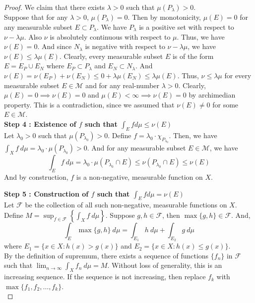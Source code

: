 \begin{proof}
	We claim that there exists $\lambda > 0$ such that $\mu(P_\lambda) > 0$.\\
	Suppose that for any $\lambda > 0$, $\mu(P_\lambda) = 0$.
	Then by monotonicity, $\mu(E) = 0$ for any measurable subset $E \subset P_\lambda$.
	We have $P_\lambda$ is a positive set with respect to $\nu-\lambda\mu$. 
	Also $\nu$ is absolutely continuous with respect to $\mu$.
	Thus, we have $\nu(E)=0$.
	And since $N_\lambda$ is negative with respect to $\nu-\lambda\mu$, we have $\nu(E) \le \lambda\mu(E)$.
	Clearly, every measurable subset $E$ is of the form $E = E_P \cup E_N$ where $E_P \subset P_\lambda$ and $E_N \subset N_\lambda$.
	And $\nu(E)=\nu(E_P) + \nu(E_N) \le 0+\lambda\mu(E_N) \le \lambda\mu(E)$.
	Thus, $\nu \le \lambda\mu$ for every measurable subset $E \in \mathcal{M}$ and for any real-number $\lambda > 0$.
	Clearly, $\mu(E) = 0 \implies \nu(E) = 0$ and $\mu(E) < \infty \implies \nu(E) = 0$ by archimedian property.
	This is a contradiction, since we assumed that $\nu(E) \ne 0$ for some $E \in \mathcal{M}$.\\

	\textbf{Step 4 : Existence of $f$ such that $\int_E fd\mu \le \nu(E)$}\\
	Let $\lambda_0 >0$ such that $\mu(P_{\lambda_0}) > 0$.
	Define $f = \lambda_0 \cdot \chi_{P_{\lambda_0}}$.
	Then, we have $\displaystyle \int_X f \ d\mu = \lambda_0 \cdot \mu(P_{\lambda_0}) > 0$.
	And for any measurable subset $E \in \mathcal{M}$, we have
	\[ \int_E f \ d\mu = \lambda_0 \cdot \mu(P_{\lambda_0} \cap E) \le \nu(P_{\lambda_0} \cap E) \le \nu(E) \]
	And by construction, $f$ is a non-negative, measurable function on $X$.

	\textbf{Step 5 : Construction of $f$ such that $\int_E fd\mu = \nu(E)$}\\
	Let $\mathcal{F}$ be the collection of all such non-negative, measurable functions on $X$.
	Define $\displaystyle M = \sup_{f \in \mathcal{F}} \left\{ \int_X f \ d\mu \right\}$.
	Suppose $g,h \in \mathcal{F}$, then $\max\{g,h\} \in \mathcal{F}$.
	And,
	\[ \int_E \max \{g,h\} \ d\mu = \int_{E_1} h \ d\mu + \int_{E_2} g \ d\mu \]
	where $E_1 = \{ x \in X : h(x) > g(x) \}$ and $E_2 = \{ x \in X : h(x) \le g(x) \}$.\\

	By the definition of supremum, there exists a sequence of functions $\{f_n\}$ in $\mathcal{F}$ such that $\lim_{n \to \infty} \int_X f_n \ d\mu = M$.
	Without loss of generality, this is an increasing sequence.
	If the sequence is not increasing, then replace $f_k$ with $\max\{f_1,f_2,\dots,f_k\}$.\\


\end{proof}
